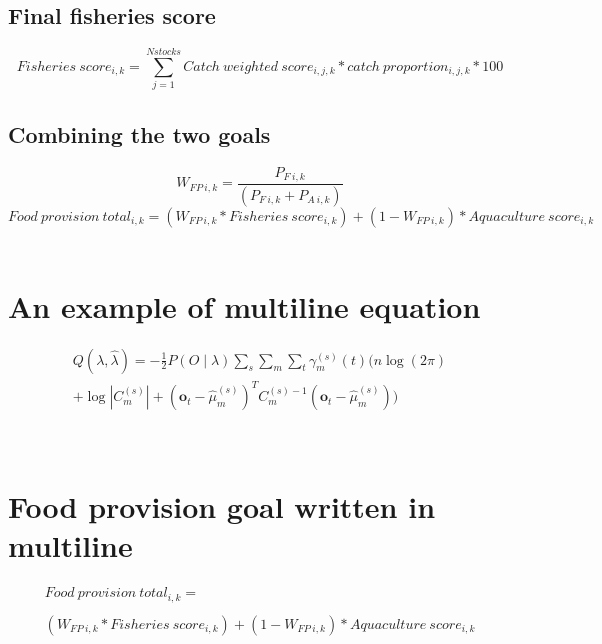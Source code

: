\documentclass[
]{article}
\begin{document}
\hypertarget{final-fisheries-score}{%
\subsection{Final fisheries score}\label{final-fisheries-score}}

\[Fisheries\ score_{i,k} = \sum_{j = 1}^{N stocks}Catch\ weighted\ score_{i,j,k} * catch\ proportion_{i,j,k}*100\]

\hypertarget{combining-the-two-goals}{%
\subsection{Combining the two goals}\label{combining-the-two-goals}}

\[W_{FP\ i, k} = \frac{P_{F\ i,k}}{(P_{F\ i,k} + P_{A\ i,k})}\]
\[Food\ provision\ total_{i,k} = (W_{FP\ i,k} *Fisheries\ score_{i,k}) + (1 - W_{FP\ i,k})*Aquaculture\ score_{i,k}\]
\(~\) \(~\) \(~\)

\hypertarget{an-example-of-multiline-equation}{%
\section{An example of multiline
equation}\label{an-example-of-multiline-equation}}

\[
\begin{multline}
  Q(\lambda,\hat{\lambda}) = -\frac{1}{2} P(O \mid \lambda ) \sum_s \sum_m \sum_t \gamma_m^{(s)} (t) \biggl( n \log(2 \pi ) \\
  + \log \left| C_m^{(s)} \right| + \left( \mathbf{o}_t - \hat{\mu}_m^{(s)} \right) ^T C_m^{(s)-1} \left(\mathbf{o}_t - \hat{\mu}_m^{(s)}\right) \biggr)
\end{multline}
\]

\(~\) \(~\) \(~\)

\hypertarget{food-provision-goal-written-in-multiline}{%
\section{Food provision goal written in
multiline}\label{food-provision-goal-written-in-multiline}}

\[
\begin{multline}
  Food\ provision\ total_{i,k}  = \\
  \\
  (W_{FP\ i,k} *Fisheries\ score_{i,k}) + (1 - W_{FP\ i,k})*Aquaculture\ score_{i,k}  
\end{multline}
\]
\end{document}
